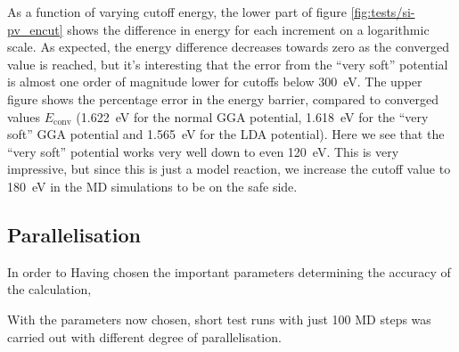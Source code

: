 \documentclass[11pt,bibliography=totoc,index=totoc]{scrbook}   %
\begin{document}
As a function of varying cutoff energy, the lower part of figure \ref{fig:tests/si-pv_encut} shows the difference in energy for each increment on a logarithmic scale. 
As expected, the energy difference decreases towards zero as the converged value is reached, but it's interesting that the error from the ``very soft'' potential is almost one order of magnitude lower for cutoffs below 300~eV.
The upper figure shows the percentage error in the energy barrier, compared to converged values $E_{\text{conv}}$ (1.622~eV for the normal GGA potential, 1.618~eV for the ``very soft'' GGA potential and 1.565~eV for the LDA potential).
Here we see that the ``very soft'' potential works very well down to even 120~eV.
This is very impressive, but since this is just a model reaction, we increase the cutoff value to 180~eV in the MD simulations to be on the safe side.






\subsection{Parallelisation}

In order to 
Having chosen the important parameters determining the accuracy of the calculation, 

With the parameters now chosen, short test runs with just 100 MD steps was carried out with different degree of parallelisation.
\end{document}
